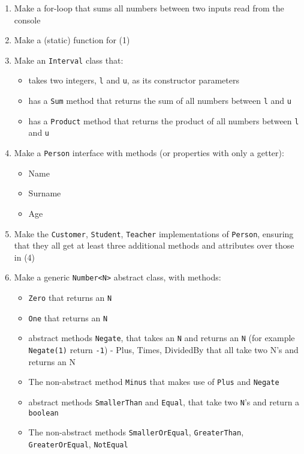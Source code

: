 \begin{enumerate}
	\item Make a for-loop that sums all numbers between two inputs read from the console

	\item Make a (static) function for (1)

	\item Make an \texttt{Interval} class that:
	\begin{itemize}
		\item takes two integers, \texttt{l} and \texttt{u}, as its constructor parameters
		\item has a \texttt{Sum} method that returns the sum of all numbers between \texttt{l} and \texttt{u}
		\item has a \texttt{Product} method that returns the product of all numbers between \texttt{l} and \texttt{u}
	\end{itemize}

	\item Make a \texttt{Person} interface with methods (or properties with only a getter):
	\begin{itemize}
		\item Name
		\item Surname
		\item Age
	\end{itemize}

	\item Make the \texttt{Customer}, \texttt{Student}, \texttt{Teacher} implementations of \texttt{Person}, ensuring that they all get at least three additional methods and attributes over those in (4)

	\item Make a generic \texttt{Number<N>} abstract class, with methods:
	\begin{itemize}
		\item \texttt{Zero} that returns an \texttt{N}
		\item \texttt{One} that returns an \texttt{N}
		\item abstract methods \texttt{Negate}, that takes an \texttt{N} and returns an \texttt{N} (for example \texttt{Negate(1)} return \texttt{-1})
- Plus, Times, DividedBy that all take two N's and returns an N
		\item The non-abstract method \texttt{Minus} that makes use of \texttt{Plus} and \texttt{Negate}
		\item abstract methods \texttt{SmallerThan} and \texttt{Equal}, that take two \texttt{N}'s and return a \texttt{boolean}
		\item The non-abstract methods \texttt{SmallerOrEqual}, \texttt{GreaterThan}, \texttt{GreaterOrEqual}, \texttt{NotEqual}
	\end{itemize}
	

\end{enumerate}
